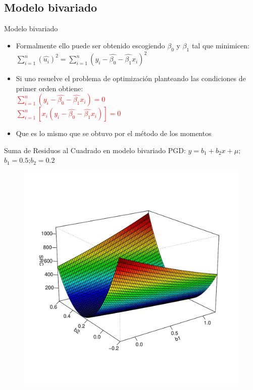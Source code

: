 \subsection{Modelo bivariado}
\begin{frame}{Modelo bivariado}
	\begin{itemize}
		\item Formalmente ello puede ser obtenido escogiendo $\beta_{0}$ y $\beta_{1}$ tal que minimicen: \\
		$\sum_{i=1}^{n}(\hat{u_{i}})^{2}=\sum_{i=1}^{n}(y_{i}-\hat{\beta_{0}}-\hat{\beta_{1}}x_{i})^{2}$
		\pause
		\item Si uno resuelve el problema de optimización planteando las condiciones de primer orden obtiene: \\
		\textcolor{red}{$ \sum_{i=1}^{n}(y_{i}-\hat{\beta_{0}}-\hat{\beta_{1}}x_{i})=0 $} \\
		\textcolor{red}{$ \sum_{i=1}^{n}[x_{i}(y_{i}-\hat{\beta_{0}}-\hat{\beta_{1}}x_{i})]=0 $}
		\pause
		\item Que es lo mismo que se obtuvo por el método de los momentos
	\end{itemize}
\end{frame}
\begin{frame}{Suma de Residuos al Cuadrado en modelo bivariado}
	PGD: $y=b_1+b_2x+\mu$;\quad $b_1=0.5$;\quad $b_2=0.2$
	\begin{figure}
		\centering
		\includegraphics[scale=.38]{fig/SRC.pdf}
	\end{figure}
\end{frame}

